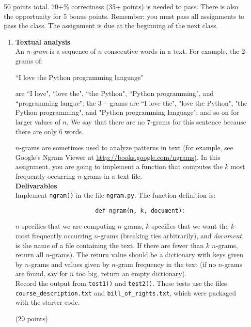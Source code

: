 \documentclass{article}
\newcounter{points}
\newcommand\setpoints[1]{\addtocounter{points}{#1}(#1 points)}
\begin{document}
\pagestyle{fancy}

50 points total.  70+\% correctness (35+ points) is needed to pass.  There is also the opportunity for 5 bonus points.  Remember: you must pass all assignments to pass the class.  The assignment is due at the beginning of the next class.

\begin{enumerate}
\item \textbf{Textual analysis} \\
An \emph{n-gram} is a sequence of $n$ consecutive words in a text.  For example, the $2$-grams of:
\begin{center}
 ``I love the Python programming language"
\end{center} are ``I love", ``love the", ``the Python", ``Python programming", and ``programming langue";  the $3-$grams are ``I love the", "love the Python", "the Python programming", and "Python programming language"; and so on for larger values of $n$.  We say that there are no $7$-grams for this sentence because there are only $6$ words.

$n$-grams are sometimes used to analyze patterns in text (for example, see Google's Ngram Viewer at \url{http://books.google.com/ngrams}).  In this assignment, you are going to implement a function that computes the $k$ most frequently occurring $n$-grams in a text file. \\

\textbf{Delivarables} \\
Implement \texttt{ngram()} in the file \texttt{ngram.py}.  The function definition is: \\

\begin{lstlisting}
                       def ngram(n, k, document):
\end{lstlisting}
$n$ specifies that we are computing $n$-grams, $k$ specifies that we want the $k$ most frequently occurring $n$-grams (breaking ties arbitrarily), and \emph{document} is the name of a file containing the text.  If there are fewer than $k$ $n$-grams, return all $n$-grams).  The return value should be a dictionary with keys given by $n$-grams and values given by $n$-gram frequency in the text  (if no $n$-grams are found, say for $n$ too big, return an empty dictionary).  \\

Record the output from \texttt{test1()} and \texttt{test2()}.  These tests use the files \texttt{course\_description.txt} and \texttt{bill\_of\_rights.txt}, which were packaged with the starter code. \setpoints{20} \\


\end{enumerate}
\end{document}
